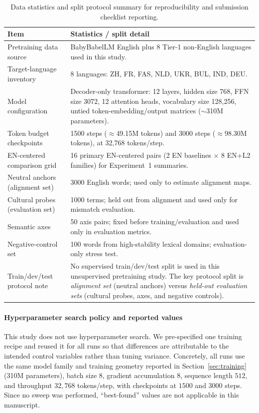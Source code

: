 \documentclass[11pt]{article}
\begin{document}
\begin{table}[t]
\centering
\scriptsize
\begin{tabular}{@{}p{}p{}@{}}
\toprule
Item & Statistics / split detail \\
\midrule
Pretraining data source & BabyBabelLM English plus 8 Tier-1 non-English languages used in this study. \\
Target-language inventory & 8 languages: ZH, FR, FAS, NLD, UKR, BUL, IND, DEU. \\
Model configuration & Decoder-only transformer: 12 layers, hidden size 768, FFN size 3072, 12 attention heads, vocabulary size 128{,}256, untied token-embedding/output matrices (\(\sim\)310M parameters). \\
Token budget checkpoints & 1500 steps ($\approx$49.15M tokens) and 3000 steps ($\approx$98.30M tokens), at 32,768 tokens/step. \\
EN-centered comparison grid & 16 primary EN-centered pairs (2 EN baselines $\times$ 8 EN+L2 families) for Experiment~1 summaries. \\
Neutral anchors (alignment set) & 3000 English words; used only to estimate alignment maps. \\
Cultural probes (evaluation set) & 1000 terms; held out from alignment and used only for mismatch evaluation. \\
Semantic axes & 50 axis pairs; fixed before training/evaluation and used only in evaluation metrics. \\
Negative-control set & 100 words from high-stability lexical domains; evaluation-only stress test. \\
Train/dev/test protocol note & No supervised train/dev/test split is used in this unsupervised pretraining study. The key protocol split is \emph{alignment set} (neutral anchors) versus \emph{held-out evaluation sets} (cultural probes, axes, and negative controls). \\
\bottomrule
\end{tabular}
\caption{Data statistics and split protocol summary for reproducibility and submission checklist reporting.}
\label{tab:appendix-data-stats-splits}
\end{table}

\paragraph{Hyperparameter search policy and reported values}
This study does not use hyperparameter search. We pre-specified one training recipe and reused it for all runs so that differences are attributable to the intended control variables rather than tuning variance. Concretely, all runs use the same model family and training geometry reported in Section~\ref{sec:training} (310M parameters), batch size $8$, gradient accumulation $8$, sequence length $512$, and throughput $32{,}768$ tokens/step, with checkpoints at $1500$ and $3000$ steps. Since no sweep was performed, ``best-found'' values are not applicable in this manuscript.
\end{document}
